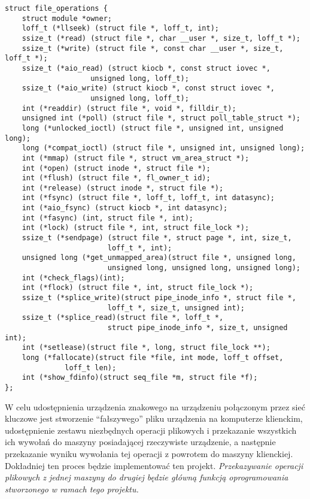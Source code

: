 \documentclass[10pt]{article}
\begin{document}
\begin{verbatim}
struct file_operations {
    struct module *owner;
    loff_t (*llseek) (struct file *, loff_t, int);
    ssize_t (*read) (struct file *, char __user *, size_t, loff_t *);
    ssize_t (*write) (struct file *, const char __user *, size_t, loff_t *);
    ssize_t (*aio_read) (struct kiocb *, const struct iovec *,
                    unsigned long, loff_t);
    ssize_t (*aio_write) (struct kiocb *, const struct iovec *,
                    unsigned long, loff_t);
    int (*readdir) (struct file *, void *, filldir_t);
    unsigned int (*poll) (struct file *, struct poll_table_struct *);
    long (*unlocked_ioctl) (struct file *, unsigned int, unsigned long);
    long (*compat_ioctl) (struct file *, unsigned int, unsigned long);
    int (*mmap) (struct file *, struct vm_area_struct *);
    int (*open) (struct inode *, struct file *);
    int (*flush) (struct file *, fl_owner_t id);
    int (*release) (struct inode *, struct file *);
    int (*fsync) (struct file *, loff_t, loff_t, int datasync);
    int (*aio_fsync) (struct kiocb *, int datasync);
    int (*fasync) (int, struct file *, int);
    int (*lock) (struct file *, int, struct file_lock *);
    ssize_t (*sendpage) (struct file *, struct page *, int, size_t,
                        loff_t *, int);
    unsigned long (*get_unmapped_area)(struct file *, unsigned long,
                        unsigned long, unsigned long, unsigned long);
    int (*check_flags)(int);
    int (*flock) (struct file *, int, struct file_lock *);
    ssize_t (*splice_write)(struct pipe_inode_info *, struct file *,
                        loff_t *, size_t, unsigned int);
    ssize_t (*splice_read)(struct file *, loff_t *,
                        struct pipe_inode_info *, size_t, unsigned int);
    int (*setlease)(struct file *, long, struct file_lock **);
    long (*fallocate)(struct file *file, int mode, loff_t offset,
              loff_t len);
    int (*show_fdinfo)(struct seq_file *m, struct file *f);
};
\end{verbatim}

W celu udostępnienia urządzenia znakowego na urządzeniu połączonym przez sieć kluczowe jest stworzenie ``fałszywego'' pliku urządzenia na komputerze klienckim, udostępnienie zestawu niezbędnych operacji plikowych i przekazanie wszystkich ich wywołań do maszyny posiadającej rzeczywiste urządzenie, a następnie przekazanie wyniku wywołania tej operacji z powrotem do maszyny klienckiej. Dokładniej ten proces będzie implementować ten projekt. \emph{Przekazywanie operacji plikowych z jednej maszyny do drugiej będzie główną funkcją oprogramowania stworzonego w ramach tego projektu.}
\end{document}
